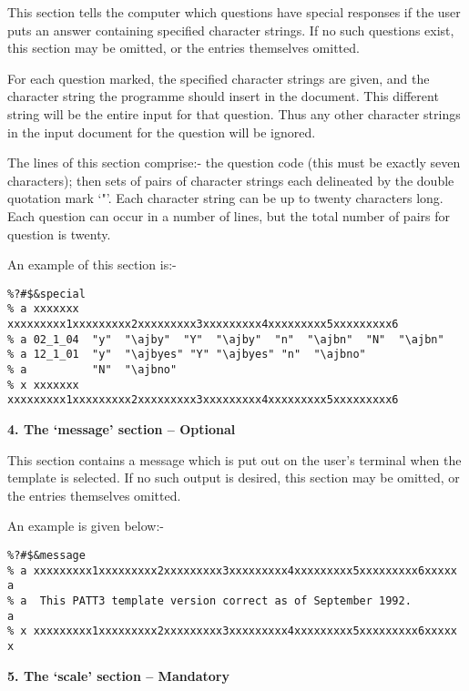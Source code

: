 This section tells the computer which questions have special responses if
the user puts an answer containing specified character strings. If no such
questions exist, this section may be omitted, or the entries themselves
omitted. 

For each question marked, the specified character strings are given, and
the character string the programme should insert in the document. This
different string will be the entire input for that question. Thus any other
character strings in the input document for the question will be ignored. 

The lines of this section comprise:- the question code (this must be
exactly seven characters); then sets of  pairs of character strings each
delineated by the double quotation mark `"'. Each character string can be
up to twenty characters long. Each question can occur in a number of lines,
but the total number of pairs for question is twenty. 

An example of this section is:-

\begin{verbatim}
%?#$&special
% a xxxxxxx xxxxxxxxx1xxxxxxxxx2xxxxxxxxx3xxxxxxxxx4xxxxxxxxx5xxxxxxxxx6
% a 02_1_04  "y"  "\ajby"  "Y"  "\ajby"  "n"  "\ajbn"  "N"  "\ajbn"
% a 12_1_01  "y"  "\ajbyes" "Y" "\ajbyes" "n"  "\ajbno"
% a          "N"  "\ajbno"
% x xxxxxxx xxxxxxxxx1xxxxxxxxx2xxxxxxxxx3xxxxxxxxx4xxxxxxxxx5xxxxxxxxx6
\end{verbatim}

\vspace*{0.2cm}
{\bf \large 4. The `message' section -- Optional}
\vspace*{0.2cm}

This section contains a message which is put out on the user's terminal
when the template is selected. If no such output is desired, this section
may be omitted, or the entries themselves omitted. 

An example is given below:- 

\begin{verbatim}
%?#$&message
% a xxxxxxxxx1xxxxxxxxx2xxxxxxxxx3xxxxxxxxx4xxxxxxxxx5xxxxxxxxx6xxxxx a
% a  This PATT3 template version correct as of September 1992.        a
% x xxxxxxxxx1xxxxxxxxx2xxxxxxxxx3xxxxxxxxx4xxxxxxxxx5xxxxxxxxx6xxxxx x
\end{verbatim}

\vspace*{0.2cm}
{\bf \large 5. The `scale' section -- Mandatory}
\vspace*{0.2cm}


